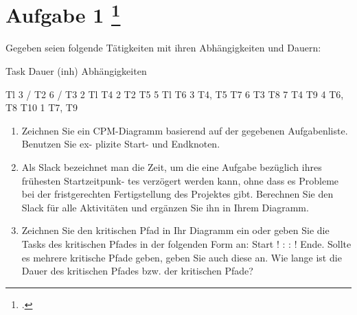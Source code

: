 \documentclass{lehramt-informatik-aufgabe}
\begin{document}
\section{Aufgabe 1
\footcite{66116:2021:03}}

Gegeben seien folgende Tätigkeiten mit ihren Abhängigkeiten und Dauern:

Task Dauer (inh) Abhängigkeiten

Tl 3 /
T2 6 /
T3 2 Tl
T4 2 T2
T5 5 Tl
T6 3 T4, T5
T7 6 T3
T8 7 T4
T9 4 T6, T8
T10 1 T7, T9
\begin{enumerate}


\item Zeichnen Sie ein CPM-Diagramm basierend auf der gegebenen
Aufgabenliste. Benutzen Sie ex- plizite Start- und Endknoten.


\item Als Slack bezeichnet man die Zeit, um die eine Aufgabe bezüglich
ihres frühesten Startzeitpunk- tes verzögert werden kann, ohne dass es
Probleme bei der fristgerechten Fertigstellung des Projektes gibt.
Berechnen Sie den Slack für alle Aktivitäten und ergänzen Sie ihn in
Ihrem Diagramm.


\item Zeichnen Sie den kritischen Pfad in Ihr Diagramm ein oder geben
Sie die Tasks des kritischen Pfades in der folgenden Form an: Start !  :
: ! Ende. Sollte es mehrere kritische Pfade geben, geben Sie auch diese
an. Wie lange ist die Dauer des kritischen Pfades bzw. der kritischen
Pfade?

\end{enumerate}
\end{document}
